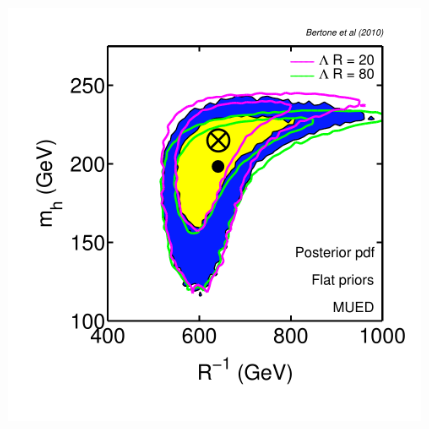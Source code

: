 \documentclass[xcolor=dvipsnames]{beamer}
\begin{document}
\begin{frame}
\begin{columns}[c]
\includegraphics[width=0.82\textwidth,trim = 0 20 0 40, clip = true]{UED}\\
\end{columns}

\end{frame}
\end{document}
